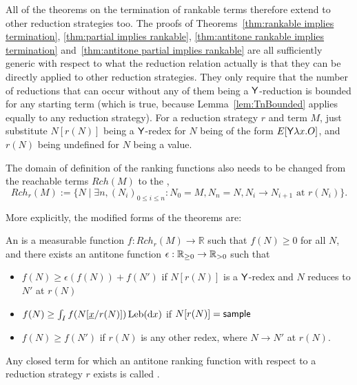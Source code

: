 All of the theorems on the termination of rankable terms therefore extend to other reduction strategies too. The proofs of Theorems~\ref{thm:rankable implies termination}, \ref{thm:partial implies rankable},
\ref{thm:antitone rankable implies termination} and~\ref{thm:antitone partial implies rankable} are all sufficiently generic with respect to what the reduction relation actually is that they can be directly applied to other reduction strategies. 
They only require that the number of reductions that can occur without any of them being a $\mathsf{Y}$-reduction is bounded for any starting term (which is true, because Lemma~\ref{lem:TnBounded} applies equally to any reduction strategy). For a reduction strategy $r$ and term $M$, just substitute $N[r(N)]$ being a $\mathsf{Y}$-redex for $N$ being of the form $E[\mathsf{Y} \lambda x. O]$, and $r(N)$ being undefined for $N$ being a value.


The domain of definition of the ranking functions also needs to be changed from the reachable terms $\mathit{Rch}(M)$ to the ,
\[
\mathit{Rch}_r(M) := \{N \mid \exists n, (N_i)_{0 \leq i \leq n} : 
N_0 = M, N_n = N, N_i \to N_{i+1} \text{ at } r(N_i)\}.
\]

More explicitly, the modified forms of the theorems are:
\begin{definition}\rm
An  is a measurable function $f:\mathit{Rch}_r(M) \to \mathbb{R}$ such that $f(N) \geq 0$ for all $N$, and there exists an antitone function $\epsilon : \mathbb{R}_{{\geq}0} \to \mathbb{R}_{{>}0}$ such that
\begin{itemize}
    \item $f(N) \geq \epsilon(f(N)) + f(N')$ if $N[r(N)]$ is a $\mathsf{Y}$-redex and $N$ reduces to $N'$ at $r(N)$
    \item $f(N) \geq \int_I f(N[\underline{x}/r(N)]) \, \mathrm{Leb}(\mathrm{d}x)$ if $N[r(N)] = \mathsf{sample}$

    \item $f(N) \geq f(N')$ if $r(N)$ is any other redex, where $N \to N'$ at $r(N)$.
\end{itemize}
Any closed term for which an antitone ranking function with respect to a reduction strategy $r$ exists is called . 
\end{definition}

